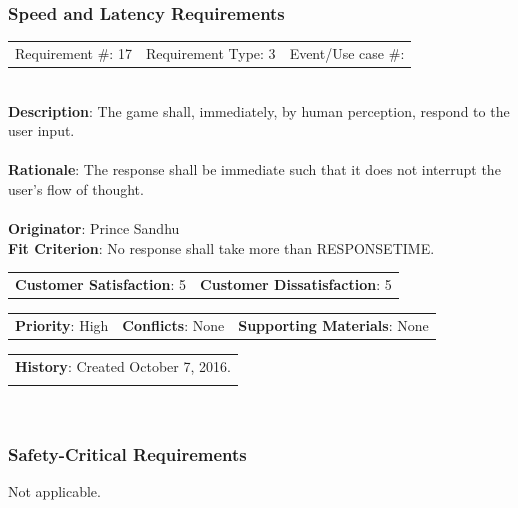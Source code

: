 \documentclass[12pt, titlepage]{article}
\begin{document}
\subsubsection{Speed and Latency Requirements}

\begin{reqbox}

\begin{tabular}{lll}
Requirement \#: 17 & Requirement Type: 3 & Event/Use case \#: \\
\end{tabular} \\

\textbf{Description}: The game shall, immediately, by human perception, respond to the user input. \\ \\
\textbf{Rationale}: The response shall be immediate such that it does not interrupt the user's flow of thought. \\ \\
\textbf{Originator}: Prince Sandhu \\
\textbf{Fit Criterion}: No response shall take more than RESPONSETIME. \\

\begin{tabular}{ll}
\textbf{Customer Satisfaction}: 5 & \textbf{Customer Dissatisfaction}: 5 \\
\end{tabular}

\begin{tabular}{lll}
\textbf{Priority}: High & \textbf{Conflicts}: None & \textbf{Supporting Materials}: None \\
\end{tabular}

\begin{tabular}{l}
\textbf{History}: Created October 7, 2016.\\ \\
\end{tabular} \\

\end{reqbox}

\subsubsection{Safety-Critical Requirements}
Not applicable.
\end{document}

